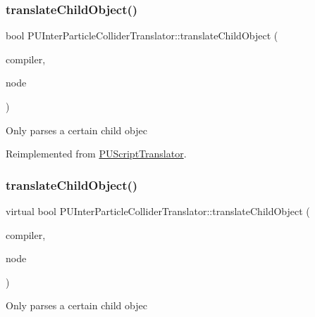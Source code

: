 \subsubsection{\texorpdfstring{translate\+Child\+Object()}{translateChildObject()}\hspace{0.1cm}{\footnotesize\ttfamily [1/2]}}
{\footnotesize\ttfamily bool P\+U\+Inter\+Particle\+Collider\+Translator\+::translate\+Child\+Object (\begin{DoxyParamCaption}\item[{\hyperlink{classPUScriptCompiler}{P\+U\+Script\+Compiler} $\ast$}]{compiler,  }\item[{\hyperlink{classPUAbstractNode}{P\+U\+Abstract\+Node} $\ast$}]{node }\end{DoxyParamCaption})\hspace{0.3cm}{\ttfamily [virtual]}}

Only parses a certain child objec 

Reimplemented from \hyperlink{classPUScriptTranslator_ab587d01348ae3e678cb700c719b2b113}{P\+U\+Script\+Translator}.

\mbox{\label{classPUInterParticleColliderTranslator_aede74b2c29e15f1c59bd72c75316ee09}} 
\subsubsection{\texorpdfstring{translate\+Child\+Object()}{translateChildObject()}\hspace{0.1cm}{\footnotesize\ttfamily [2/2]}}
{\footnotesize\ttfamily virtual bool P\+U\+Inter\+Particle\+Collider\+Translator\+::translate\+Child\+Object (\begin{DoxyParamCaption}\item[{\hyperlink{classPUScriptCompiler}{P\+U\+Script\+Compiler} $\ast$}]{compiler,  }\item[{\hyperlink{classPUAbstractNode}{P\+U\+Abstract\+Node} $\ast$}]{node }\end{DoxyParamCaption})\hspace{0.3cm}{\ttfamily [virtual]}}

Only parses a certain child objec 

